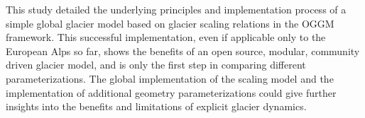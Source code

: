 This study detailed the underlying principles and implementation process of a simple global glacier model based on glacier scaling relations \citep{Marzeion2012b} in the OGGM framework. This successful implementation, even if applicable only to the European Alps so far, shows the benefits of an open source, modular, community driven glacier model, and is only the first step in comparing different parameterizations. The global implementation of the scaling model and the implementation of additional geometry parameterizations \citep[e.g., GloGEM by][]{Huss2015} could give further insights into the benefits and limitations of explicit glacier dynamics.

